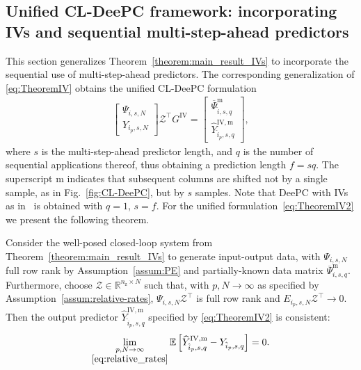 \subsection{Unified \ac{CL-DeePC} framework: incorporating \ac{IVs} and sequential multi-step-ahead predictors}
\noindent This section generalizes Theorem~\ref{theorem:main_result_IVs} to incorporate the sequential use of multi-step-ahead predictors. The corresponding generalization of \eqref{eq:TheoremIV} obtains the unified \ac{CL-DeePC} formulation
\begin{align}\label{eq:TheoremIV2}
    \begin{bmatrix}
        \Psi_{i,s,N}\\Y_{i_p,s,N}
    \end{bmatrix}\mathcal{Z}^\top G^\mathrm{IV} =
    \begin{bmatrix}
        \overline{\Psi}_{\hat{i},s,q}^\mathrm{m}\\\widehat{Y}_{\hat{i}_p,s,q}^\mathrm{IV,m}
    \end{bmatrix},
\end{align}
where $s$ is the multi-step-ahead predictor length, and $q$ is the number of sequential applications thereof, thus obtaining a prediction length $f=sq$. The superscript $\mathrm{m}$ indicates that subsequent columns are shifted not by a single sample, as in Fig.~\ref{fig:CL-DeePC}, but by $s$ samples. Note that \ac{DeePC} with \ac{IVs} as in~\cite{vanWingerden2022} is obtained with $q=1$, $s=f$. For the unified formulation~\eqref{eq:TheoremIV2} we present the following theorem.
\setcounter{thm}{1}
\begin{thm}\label{theorem:general_IV}
Consider the well-posed closed-loop system from Theorem~\ref{theorem:main_result_IVs} to generate input-output data, with $\Psi_{i,s,N}$ full row rank by Assumption~\ref{assum:PE} and partially-known data matrix $\overline{\Psi}_{i,s,q}^\mathrm{m}$. Furthermore, choose $\mathcal{Z}\in\mathbb{R}^{n_\mathrm{z}\times N}$ such that, with $p,N\rightarrow\infty$ as specified by Assumption~\ref{assum:relative-rates}, $\Psi_{i,s,N}\mathcal{Z}^\top$ is full row rank and $E_{i_p,s,N}\mathcal{Z}^\top\rightarrow0$. Then the output predictor $\widehat{Y}_{\hat{i}_p,s,q}^\mathrm{IV,m}$ specified by \eqref{eq:TheoremIV2} is consistent:
\begin{align*}%
    \lim_{\underset{\eqref{eq:relative_rates}}{p,N\rightarrow\infty}}\mathbb{E}\left[\widehat{Y}_{\hat{i}_p,s,q}^\mathrm{IV,m}-Y_{\hat{i}_p,s,q}\right]=0.
\end{align*}
\end{thm}
